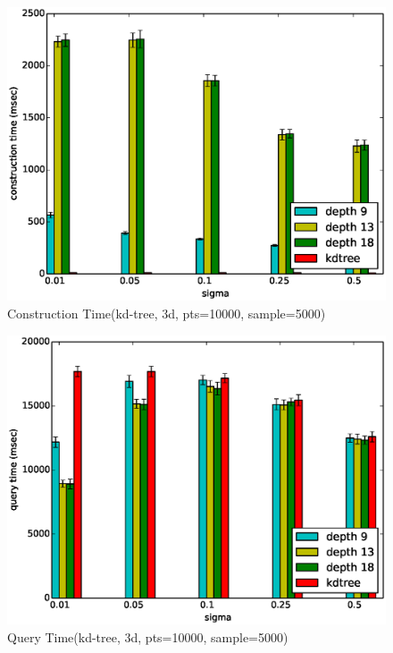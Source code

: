 \documentclass[mcs]{scsthesis}
\begin{document}
\begin{figure}
\begin{center}
\includegraphics[scale=0.5]{diagrams/kt_3d_pts10000_sample5000_ctime.eps}
\caption{Construction Time(kd-tree, 3d, pts=10000, sample=5000)}
\label{fig:max_build_depth_ctime}
\end{center}
\end{figure}

\begin{figure}
\begin{center}
\includegraphics[scale=0.5]{diagrams/kt_3d_pts10000_sample5000_qtime.eps}
\caption{Query Time(kd-tree, 3d, pts=10000, sample=5000)}
\label{fig:max_build_depth_qtime}
\end{center}
\end{figure}
\end{document}
